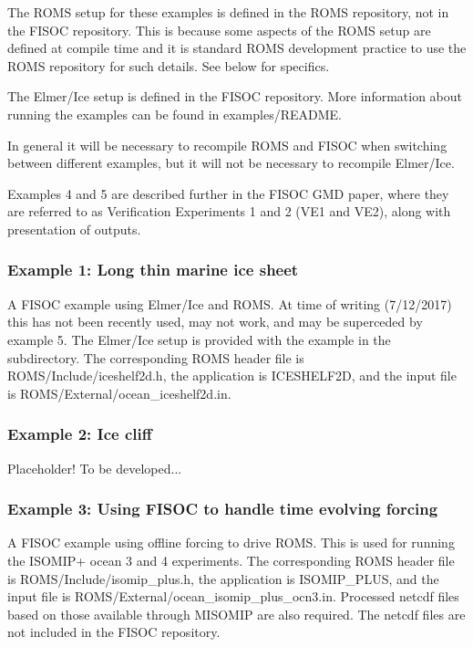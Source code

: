 \documentclass[11pt]{article}
\begin{document}
The ROMS setup for these examples is defined in the ROMS repository, not in the 
FISOC repository.  This is because some aspects of the ROMS setup are defined at 
compile time and it is standard ROMS development practice to use the ROMS 
repository for such details.  See below for specifics. 

The Elmer/Ice setup is defined in the FISOC 
repository.  
More information about running the examples can be found in 
examples/README.

In general it will be necessary to recompile ROMS and FISOC 
when switching between different examples, but it will not be necessary 
to recompile Elmer/Ice.

Examples  4 and 5 are described further in the FISOC GMD paper,
where they are referred to as Verification Experiments 1 and 2 (VE1 and VE2), 
along with presentation of outputs.



\subsubsection{Example 1: Long thin marine ice sheet}
A FISOC example using Elmer/Ice and ROMS. 
At time of writing (7/12/2017) this has not been 
recently used, may not work, and may be superceded by 
example 5. 
The Elmer/Ice setup is provided with the example in the subdirectory. 
The corresponding ROMS header file is ROMS/Include/iceshelf2d.h, 
the application is ICESHELF2D, and 
the input file is ROMS/External/ocean\_iceshelf2d.in.

\subsubsection{Example 2: Ice cliff}
Placeholder!  To be developed...

\subsubsection{Example 3: Using FISOC to handle time evolving forcing}
A FISOC example using offline forcing to drive ROMS. 
This is used for running the ISOMIP+ ocean 3 and 4 experiments.
The corresponding ROMS header file is ROMS/Include/isomip\_plus.h, 
the application is ISOMIP\_PLUS, 
and the input file is ROMS/External/ocean\_isomip\_plus\_ocn3.in.
Processed netcdf files based on those available through MISOMIP 
are also required.
The netcdf files are not included in the FISOC repository.
\end{document}
